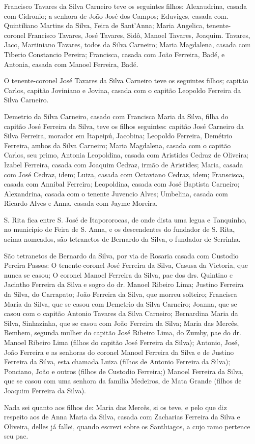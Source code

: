 Francisco Tavares da Silva Carneiro teve os seguintes filhos: Alexaudrina, casada com Cidronio; a senhora de João José dos Campos; Eduviges, casada com. Quintiliano Martins da Silva, Feira de Sant'Anna; Maria Angelica, tenente-coronel Francisco Tavares, José Tavares, Sidô, Manoel Tavares, Joaquim. Tavares, Jaco, Martiniano Tavares, todos da Silva Carneiro; Maria Magdalena, casada com Tiberio Constancio Pereira; Francisca, casada com João Ferreira, Badé, e Antonia, casada com Manoel Ferreira, Badé.

O tenente-coronel José Tavares da Silva Carneiro teve os seguintes filhos; capitão Carlos, capitão Joviniano e Jovina, casada com o capitão Leopoldo Ferreira da Silva Carneiro.

Demetrio da Silva Carneiro, casado com Francisca Maria da Silva, filha do capitão José Ferreira da Silva, teve os filhos seguintes: capitão José Carneiro da Silva Ferreira, morador em Itapeipú, Jacobina; Leopoldo Ferreira, Demétrio Ferreira, ambos da Silva Carneiro; Maria Magdalena, casada com o capitão Carlos, seu primo, Antonia Leopoldina, casada com Aristides Cedraz de Oliveira; Izabel Ferreira, casada com Joaquim Cedraz, irmão de Aristides; Maria, casada com José Cedraz, idem; Luiza, casada com Octaviano Cedraz, idem; Franscisca, casada com Annibal Ferreira; Leopoldina, casada com José Baptista Carneiro; Alexandrina, casada com o tenente Juvencio Alves; Umbelina, casada com Ricardo Alves e Anna, casada com Jayme Moreira.

S. Rita fica entre S. José de Itapororocas, de onde dista uma legua e Tanquinho, no municipio de Feira de S. Anna, e os descendentes do fundador de S. Rita, acima nomeados, são tetranetos de Bernardo da Silva, o fundador de Serrinha.


São tetranetos de Bernardo da Silva, por via de Rosaria casada com Custodio Pereira Passos: O tenente-coronel José Ferreira da Silva, Casusa da Victoria, que nunca se casou; O coronel Manoel Ferreira da Silva, pae dos drs. Quintino e Jacintho Ferreira da Silva e sogro do dr. Manoel Ribeiro Lima; Justino Ferreira da Silva, do Carrapato; João Ferreira da Silva, que morreu solteiro; Francisca Maria da Silva, que se casou com Demetrio da Silva Carneiro; Joanna, que se casou com o capitão Antonio Tavares da Silva Carneiro; Bernardina Maria da Silva, Sinhazinha, que se casou com João Ferreira da Silva; Maria das Mercês, Bembem, segunda mulher do capitão José Ribeiro Lima, do Zumby, pae do dr. Manoel Ribeiro Lima (filhos do capitão José Ferreira da Silva); Antonio, José, João Ferreira e as senhoras do coronel Manoel Ferreira da Silva e de Justino Ferreira da Silva, esta chamada Luiza (filhos de Antonio Ferreira da Silva); Ponciano, João e outros (filhos de Custodio Ferreira;) Manoel Ferreira da
Silva, que se casou com uma senhora da familia Medeiros, de Mata Grande (filhos de Joaquim Ferreira da Silva).

Nada sei quanto aos filhos de: Maria das Mercês, si os teve, e pelo que diz respeito aos de Anna Maria da Silva, casada com Zacharias Ferreira da Silva e Oliveira, delles já fallei, quando escrevi sobre os Santhiagos, a cujo ramo pertence seu pae.



